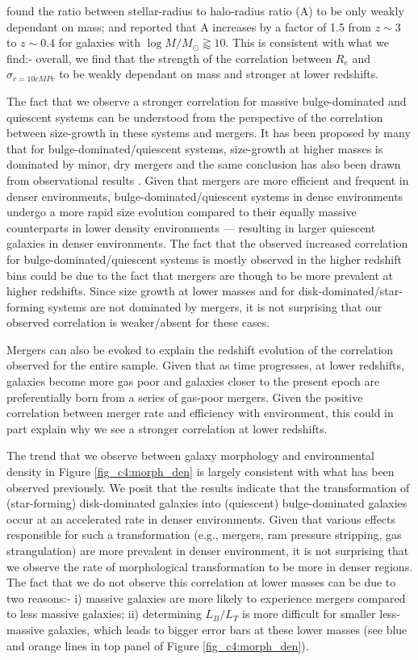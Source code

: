 \citet{somerville18} found the ratio between stellar-radius to halo-radius ratio (A) to be only weakly dependant on mass; and reported that A increases by a factor of 1.5 from $z\sim3$ to $z\sim0.4$ for galaxies with $\log M/M_{\odot} \gtrapprox 10$. This is consistent with what we find:- overall, we find that the strength of the correlation between $R_e$ and $\sigma_{r=10cMPc}$ to be weakly dependant on mass and stronger at lower redshifts. 

The fact that we observe a stronger correlation for massive bulge-dominated and quiescent systems can be understood from the perspective of the correlation between size-growth in these systems and mergers. It has been proposed by many that for bulge-dominated/quiescent systems, size-growth at higher masses is dominated by minor, dry mergers \citep[e.g.,][]{shankar13} and the same conclusion has also been drawn from observational results \citep[e.g.,][]{mowla19,hsc_mass_size}. Given that mergers are more efficient and frequent in denser environments, bulge-dominated/quiescent systems in dense environments undergo a more rapid size evolution compared to their equally massive counterparts in lower density environments --- resulting in larger quiescent galaxies in denser environments. The fact that the observed increased correlation for bulge-dominated/quiescent systems is mostly observed in the higher redshift bins could be due to the fact that mergers are though to be more prevalent at higher redshifts. Since size growth at lower masses and for disk-dominated/star-forming systems are not dominated by mergers, it is not surprising that our observed correlation is weaker/absent for these cases. 

Mergers can also be evoked to explain the redshift evolution of the correlation observed for the entire sample. Given that as time progresses, at lower redshifts, galaxies become more gas poor and galaxies closer to the present epoch are preferentially born from a series of gas-poor mergers. Given the positive correlation between merger rate and efficiency with environment, this could in part explain why we see a stronger correlation at lower redshifts. 

The trend that we observe between galaxy morphology and environmental density in Figure \ref{fig_c4:morph_den} is largely consistent with what has been observed previously. We posit that the results indicate that the transformation of (star-forming) disk-dominated galaxies into (quiescent) bulge-dominated galaxies occur at an accelerated rate in denser environments. Given that various effects responsible for such a transformation (e.g., mergers, ram pressure stripping, gas strangulation) are more prevalent in denser environment, it is not surprising that we observe the rate of morphological transformation to be more in denser regions. The fact that we do not observe this correlation at lower masses can be due to two reasons:- i) massive galaxies are more likely to experience mergers compared to less massive galaxies; ii) determining $L_B/L_T$ is more difficult for smaller less-massive galaxies, which leads to bigger error bars at these lower masses (see blue and orange lines in top panel of Figure \ref{fig_c4:morph_den}).




